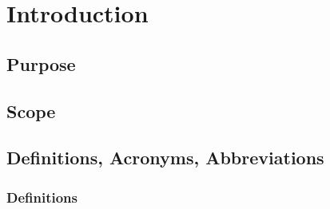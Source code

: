 \chapter{Introduction}

\section{Purpose}

\section{Scope}

\section{Definitions, Acronyms, Abbreviations}

\subsection{Definitions}

